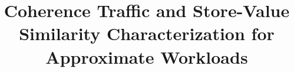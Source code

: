 \documentclass[conference]{IEEEtran}
\begin{document}
\title{Coherence Traffic and Store-Value Similarity Characterization for Approximate Workloads\\
}


\maketitle
\end{document}
